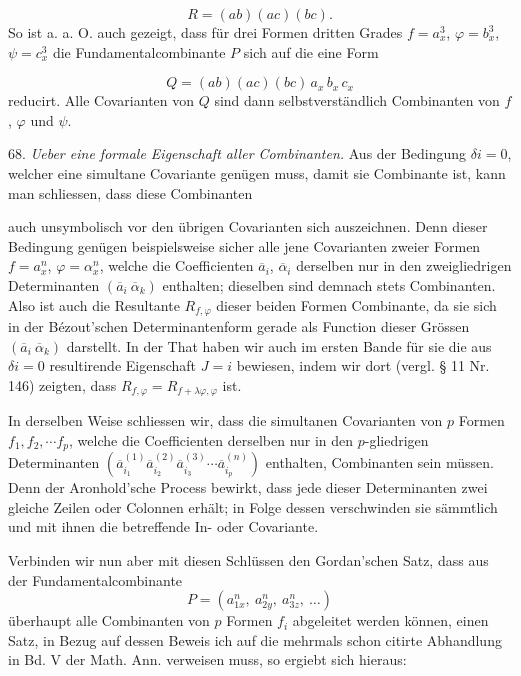 \documentclass[11pt]{article}
\providecommand{\weberpage}[1]{}
\begin{document}
\[
R = (ab)(ac)(bc) .
\]
So ist a. a. O. auch gezeigt, dass für drei Formen dritten Grades $f = a_x^3$, $\varphi = b_x^3$, $\psi = c_x^3$ die Fundamentalcombinante $P$ sich auf die eine Form

\[
Q = (ab)(ac)(bc)\, a_x\, b_x\, c_x
\]
reducirt. Alle Covarianten von $Q$ sind dann selbstverständlich Combinanten von $f$, $\varphi$ und $\psi$.

68. \textit{Ueber eine formale Eigenschaft aller Combinanten.} Aus der Bedingung $\delta i = 0$, welcher eine simultane Covariante genügen muss, damit sie Combinante ist, kann man schliessen, dass diese Combinanten


\weberpage{73}
auch unsymbolisch vor den übrigen Covarianten sich auszeichnen. Denn dieser Bedingung genügen beispielsweise sicher alle jene Covarianten zweier Formen $f=a_x^n$, $\varphi=\alpha_x^n$, welche die Coefficienten $\overline a_i$, $\overline\alpha_i$ derselben nur in den zweigliedrigen Determinanten $(\overline a_i\ \overline\alpha_k)$ enthalten; dieselben sind demnach stets Combinanten. Also ist auch die Resultante $R_{f,\varphi}$ dieser beiden Formen Combinante, da sie sich in der Bézout'schen Determinantenform gerade als Function dieser Grössen $(\overline a_i\ \overline\alpha_k)$ darstellt. In der That haben wir auch im ersten Bande für sie die aus $\delta i=0$ resultirende Eigenschaft $J=i$ bewiesen, indem wir dort (vergl. § 11 Nr. 146) zeigten, dass $R_{f,\varphi}=R_{f+\lambda\varphi,\varphi}$ ist.

In derselben Weise schliessen wir, dass die simultanen Covarianten von $p$ Formen $f_1, f_2, \cdots f_p$, welche die Coefficienten derselben nur in den $p$-gliedrigen Determinanten $(\overline a_{i_1}^{(1)}\overline a_{i_2}^{(2)}\overline a_{i_3}^{(3)}\cdots\overline a_{i_p}^{(n)})$ enthalten, %
Combinanten sein müssen. Denn der Aronhold'sche Process bewirkt, dass jede dieser Determinanten zwei gleiche Zeilen oder Colonnen erhält; in Folge dessen verschwinden sie sämmtlich und mit ihnen die betreffende In- oder Covariante.

Verbinden wir nun aber mit diesen Schlüssen den Gordan'schen Satz, dass aus der Fundamentalcombinante
\[
P = (a_{1x}^n,\ a_{2y}^n,\ a_{3z}^n,\ \dots)
\]
überhaupt alle Combinanten von $p$ Formen $f_i$ abgeleitet werden können, einen Satz, in Bezug auf dessen Beweis ich auf die mehrmals schon citirte Abhandlung in Bd. V der Math. Ann. verweisen muss, so ergiebt sich hieraus:
\end{document}
